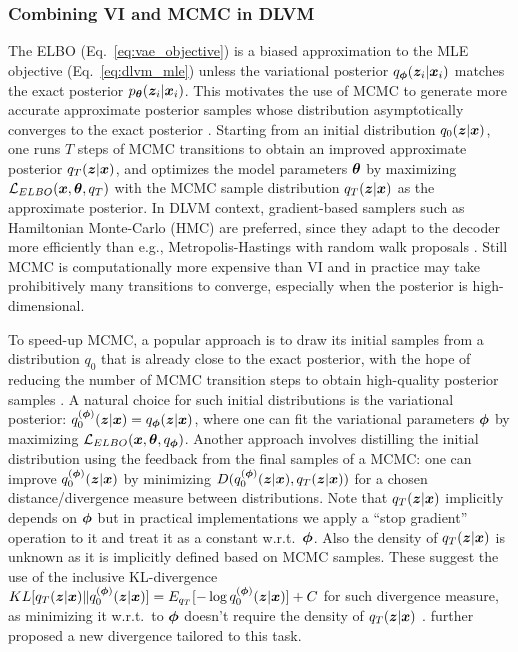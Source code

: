 \subsubsection{Combining VI and MCMC in DLVM}
The ELBO (Eq.~\eqref{eq:vae_objective}) is a biased approximation to the MLE objective (Eq.~\eqref{eq:dlvm_mle}) unless the variational posterior $q_{\bm{\phi}}(\bm{z}_i | \bm{x}_i)$ matches the exact posterior $p_{\bm{\theta}}(\bm{z}_i | \bm{x}_i)$. This motivates the use of MCMC to generate more accurate approximate posterior samples whose distribution asymptotically converges to the exact posterior \citep{doucet2023differentiable,hoffman2017learning}. Starting from an initial distribution $q_0(\bm{z} | \bm{x})$, one runs $T$ steps of MCMC transitions to obtain an improved approximate posterior $q_T(\bm{z} | \bm{x})$, and optimizes the model parameters $\bm{\theta}$ by maximizing $\mathcal{L}_{ELBO}(\bm{x}, \bm{\theta}, q_T)$ with the MCMC sample distribution $q_T(\bm{z} | \bm{x})$ as the approximate posterior.
%
In DLVM context, gradient-based samplers such as Hamiltonian Monte-Carlo (HMC) \citep{neal2010mcmc,duane1987hybrid} are preferred, since they adapt to the decoder more efficiently than e.g., Metropolis-Hastings \citep{metropolis1953equation} with random walk proposals \citep{metropolis1953equation,sherlock2010random}. Still MCMC is computationally more expensive than VI and in practice may take prohibitively many transitions to converge, especially when the posterior is high-dimensional.

To speed-up MCMC, a popular approach is to draw its initial samples from a distribution $q_0$ that is already close to the exact posterior, with the hope of reducing the number of MCMC transition steps to obtain high-quality posterior samples \citep{hoffman2017learning,geffner2021mcmc}. A natural choice for such initial distributions is the variational posterior: $q_0^{(\bm{\phi})}(\bm{z}|\bm{x})=q_{\bm{\phi}}(\bm{z}|\bm{x})$, where one can fit the variational parameters $\bm{\phi}$ by maximizing $\mathcal{L}_{ELBO}(\bm{x}, \bm{\theta}, q_{\bm{\phi}})$. 
%
Another approach involves distilling the initial distribution using the feedback from the final samples of a MCMC: one can improve $q_0^{(\bm{\phi})}(\bm{z}|\bm{x})$ by minimizing  $D(q_0^{(\bm{\phi})}(\bm{z}|\bm{x}), q_T(\bm{z}|\bm{x}))$ for a chosen distance/divergence measure between distributions. Note that $q_T(\bm{z}|\bm{x})$ implicitly depends on $\bm{\phi}$ but in practical implementations we apply a ``stop gradient'' operation to it and treat it as a constant w.r.t.~$\bm{\phi}$. Also the density of $q_T(\bm{z}|\bm{x})$ is unknown as it is implicitly defined based on MCMC samples. These suggest the use of the inclusive KL-divergence $KL[q_T(\bm{z}|\bm{x})\|q_0^{(\bm{\phi})}(\bm{z}|\bm{x})] = E_{q_T}[-\log q_0^{(\bm{\phi})}(\bm{z}|\bm{x})] + C$ for such divergence measure, as minimizing it w.r.t.~to $\bm{\phi}$ doesn't require the density of $q_T(\bm{z}|\bm{x})$ \citep{li2017mcmc}. 
\citet{pmlr-v97-ruiz19a} further proposed a new divergence tailored to this task.


